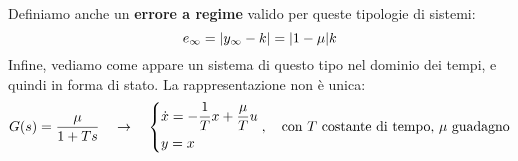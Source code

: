 \bb
Definiamo anche un \textbf{errore a regime} valido per queste tipologie di sistemi:
\begin{equation}
e_{\infty} = \abs{y_\infty - k} = \abs{1-\mu}k
\end{equation}
Infine, vediamo come appare un sistema di questo tipo nel dominio dei tempi, e quindi in forma di stato. La rappresentazione non è unica:
\begin{align*}
G(s) = \frac{\mu}{1+Ts} \quad \rightarrow \quad \begin{dcases}
\dot x = -\frac{1}{T}x + \frac{\mu}{T} u \\ y=x
\end{dcases}, \quad \textrm{con} \ T \textrm{ costante di tempo, } \mu \textrm{ guadagno} 
\end{align*}

